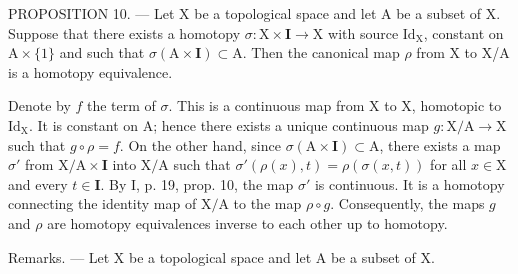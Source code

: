PROPOSITION 10. --- Let X be a topological space and let A be a subset of X. Suppose that there exists a homotopy \(\sigma: \mathrm{X} \times \mathbf{I} \to \mathrm{X}\) with source \(\mathrm{Id}_{\mathrm{X}}\), constant on \(\mathrm{A} \times \{1\}\) and such that \(\sigma(\mathrm{A} \times \mathbf{I}) \subset \mathrm{A}\). Then the canonical map \(\rho\) from X to X/A is a homotopy equivalence.

Denote by \(f\) the term of \(\sigma\). This is a continuous map from X to X, homotopic to \(\mathrm{Id}_{\mathrm{X}}\). It is constant on A; hence there exists a unique continuous map \(g \colon \mathrm{X} / \mathrm{A} \to \mathrm{X}\) such that \(g \circ \rho = f\). On the other hand, since \(\sigma(\mathrm{A} \times \mathbf{I}) \subset \mathrm{A}\), there exists a map \(\sigma'\) from \(\mathrm{X} / \mathrm{A} \times \mathbf{I}\) into \(\mathrm{X} / \mathrm{A}\) such that \(\sigma'(\rho(x), t) = \rho(\sigma(x, t))\) for all \(x \in \mathrm{X}\) and every \(t \in \mathbf{I}\). By I, p. 19, prop. 10, the map \(\sigma'\) is continuous. It is a homotopy connecting the identity map of \(\mathrm{X} / \mathrm{A}\) to the map \(\rho \circ g\). Consequently, the maps \(g\) and \(\rho\) are homotopy equivalences inverse to each other up to homotopy.

Remarks. --- Let X be a topological space and let A be a subset of X.

